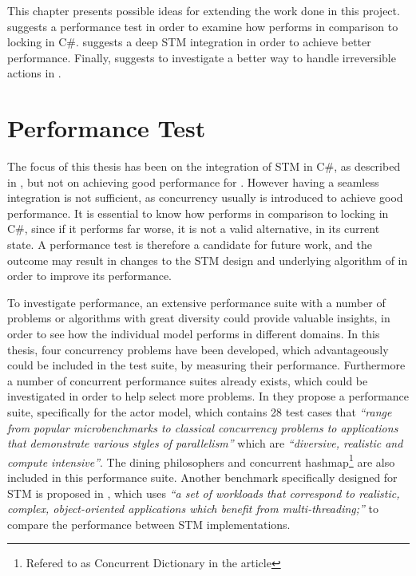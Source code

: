 \makeatletter {}\makeatother
{}
This chapter presents possible ideas for extending the work done in this project.  suggests a performance test in order to examine how \stmname performs in comparison to locking in C\#.  suggests a deep \ac{STM} integration in order to achieve better performance. Finally,  suggests to investigate a better way to handle irreversible actions in \stmname.

\label{chap:future_work}
\section{Performance Test}\label{sec:fut_perf_test}
The focus of this thesis has been on the integration of \ac{STM} in C\#, as described in , but not on achieving good performance for \stmname.
However having a seamless integration is not sufficient, as concurrency usually is introduced to achieve good performance. It is essential to know how \stmname performs in comparison to locking in C\#, since if it performs far worse, it is not a valid alternative, in its current state. A performance test is therefore a candidate for future work, and the outcome may result in changes to the \ac{STM} design and underlying algorithm of \stmname in order to improve its performance.

To investigate performance, an extensive performance suite with a number of problems or algorithms with great diversity could provide valuable insights, in order to see how the individual model performs in different domains. In this thesis, four concurrency problems have been developed, which advantageously could be included in the test suite, by measuring their performance. Furthermore a number of concurrent performance suites already exists, which could be investigated in order to help select more problems. In \cite{imam2014savina} they propose a performance suite, specifically for the actor model, which contains 28 test cases that \textit{``range from popular microbenchmarks to classical concurrency problems to applications that demonstrate various styles of parallelism''} which are \textit{``diversive, realistic and compute intensive''}. The dining philosophers and concurrent hashmap\footnote{Refered to as Concurrent Dictionary in the article} are also included in this performance suite. Another benchmark specifically designed for \ac{STM} is proposed in \cite{guerraoui2006stmbench7}, which uses \textit{``a set of workloads that correspond to realistic, complex, object-oriented applications which benefit from multi-threading;''} to compare the performance between \ac{STM} implementations. 

